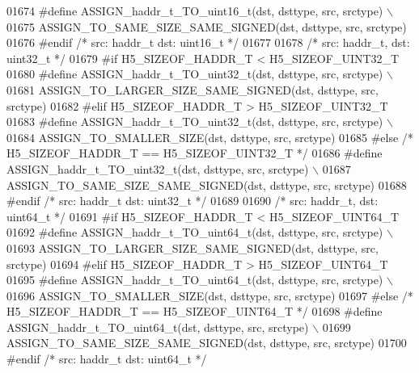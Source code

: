 \begin{DoxyCode}
01674 \textcolor{preprocessor}{    #define ASSIGN\_haddr\_t\_TO\_uint16\_t(dst, dsttype, src, srctype) \(\backslash\)}
01675 \textcolor{preprocessor}{        ASSIGN\_TO\_SAME\_SIZE\_SAME\_SIGNED(dst, dsttype, src, srctype)}
01676 \textcolor{preprocessor}{#endif }\textcolor{comment}{/* src: haddr\_t dst: uint16\_t */}\textcolor{preprocessor}{}
01677 
01678 \textcolor{comment}{/* src: haddr\_t, dst: uint32\_t */}
01679 \textcolor{preprocessor}{#if H5\_SIZEOF\_HADDR\_T < H5\_SIZEOF\_UINT32\_T}
01680 \textcolor{preprocessor}{    #define ASSIGN\_haddr\_t\_TO\_uint32\_t(dst, dsttype, src, srctype) \(\backslash\)}
01681 \textcolor{preprocessor}{        ASSIGN\_TO\_LARGER\_SIZE\_SAME\_SIGNED(dst, dsttype, src, srctype)}
01682 \textcolor{preprocessor}{#elif H5\_SIZEOF\_HADDR\_T > H5\_SIZEOF\_UINT32\_T}
01683 \textcolor{preprocessor}{    #define ASSIGN\_haddr\_t\_TO\_uint32\_t(dst, dsttype, src, srctype) \(\backslash\)}
01684 \textcolor{preprocessor}{        ASSIGN\_TO\_SMALLER\_SIZE(dst, dsttype, src, srctype)}
01685 \textcolor{preprocessor}{#else }\textcolor{comment}{/* H5\_SIZEOF\_HADDR\_T == H5\_SIZEOF\_UINT32\_T */}\textcolor{preprocessor}{}
01686 \textcolor{preprocessor}{    #define ASSIGN\_haddr\_t\_TO\_uint32\_t(dst, dsttype, src, srctype) \(\backslash\)}
01687 \textcolor{preprocessor}{        ASSIGN\_TO\_SAME\_SIZE\_SAME\_SIGNED(dst, dsttype, src, srctype)}
01688 \textcolor{preprocessor}{#endif }\textcolor{comment}{/* src: haddr\_t dst: uint32\_t */}\textcolor{preprocessor}{}
01689 
01690 \textcolor{comment}{/* src: haddr\_t, dst: uint64\_t */}
01691 \textcolor{preprocessor}{#if H5\_SIZEOF\_HADDR\_T < H5\_SIZEOF\_UINT64\_T}
01692 \textcolor{preprocessor}{    #define ASSIGN\_haddr\_t\_TO\_uint64\_t(dst, dsttype, src, srctype) \(\backslash\)}
01693 \textcolor{preprocessor}{        ASSIGN\_TO\_LARGER\_SIZE\_SAME\_SIGNED(dst, dsttype, src, srctype)}
01694 \textcolor{preprocessor}{#elif H5\_SIZEOF\_HADDR\_T > H5\_SIZEOF\_UINT64\_T}
01695 \textcolor{preprocessor}{    #define ASSIGN\_haddr\_t\_TO\_uint64\_t(dst, dsttype, src, srctype) \(\backslash\)}
01696 \textcolor{preprocessor}{        ASSIGN\_TO\_SMALLER\_SIZE(dst, dsttype, src, srctype)}
01697 \textcolor{preprocessor}{#else }\textcolor{comment}{/* H5\_SIZEOF\_HADDR\_T == H5\_SIZEOF\_UINT64\_T */}\textcolor{preprocessor}{}
01698 \textcolor{preprocessor}{    #define ASSIGN\_haddr\_t\_TO\_uint64\_t(dst, dsttype, src, srctype) \(\backslash\)}
01699 \textcolor{preprocessor}{        ASSIGN\_TO\_SAME\_SIZE\_SAME\_SIGNED(dst, dsttype, src, srctype)}
01700 \textcolor{preprocessor}{#endif }\textcolor{comment}{/* src: haddr\_t dst: uint64\_t */}\textcolor{preprocessor}{}

\end{DoxyCode}
